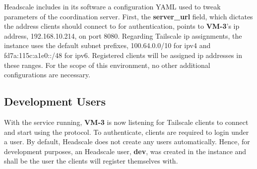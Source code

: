 \documentclass[11pt,twoside,a4paper]{report}
\begin{document}
Headscale includes in its software a configuration YAML used to tweak parameters of the coordination server. First, the \textbf{server\_url} field, which dictates the address clients should connect to for authentication, points to \textbf{VM-3}'s \ac{ip} address, 192.168.10.214, on port 8080. Regarding Tailscale \ac{ip} assignments, the instance uses the default subnet prefixes, 100.64.0.0/10 for ipv4 and fd7a:115c:a1e0::/48 for ipv6. Registered clients will be assigned \ac{ip} addresses in these ranges. For the scope of this environment, no other additional configurations are necessary.

\subsection{Development Users}

With the service running, \textbf{VM-3} is now listening for Tailscale clients to connect and start using the protocol. To authenticate, clients are required to login under a user. By default, Headscale does not create any users automatically. Hence, for development purposes, an Headscale user, \textbf{dev}, was created in the instance and shall be the user the clients will register themselves with.

\end{document}
